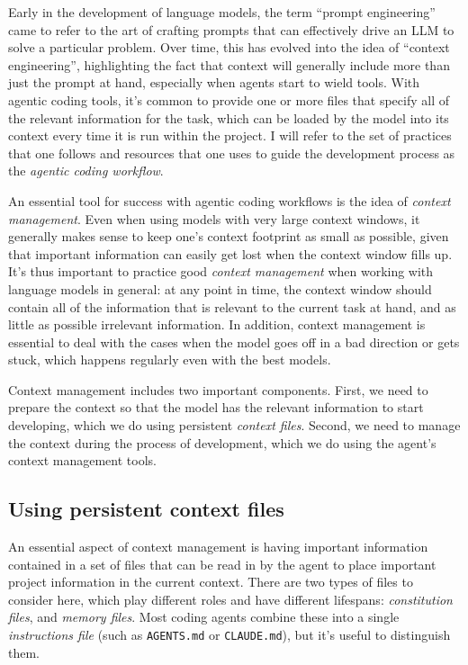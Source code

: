Early in the development of language models, the term ``prompt engineering'' came to refer to the art of crafting prompts that can effectively drive an LLM to solve a particular problem.
Over time, this has evolved into the idea of ``context engineering'', highlighting the fact that context will generally include more than just the prompt at hand, especially when agents start to wield tools.
With agentic coding tools, it's common to provide one or more files that specify all of the relevant information for the task, which can be loaded by the model into its context every time it is run within the project.
I will refer to the set of practices that one follows and resources that one uses to guide the development process as the \textit{agentic coding workflow}.

An essential tool for success with agentic coding workflows is the idea of \textit{context management}.
Even when using models with very large context windows, it generally makes sense to keep one's context footprint as small as possible, given that important information can easily get lost when the context window fills up.
It's thus important to practice good \textit{context management} when working with language models in general: at any point in time, the context window should contain all of the information that is relevant to the current task at hand, and as little as possible irrelevant information.
In addition, context management is essential to deal with the cases when the model goes off in a bad direction or gets stuck, which happens regularly even with the best models.

Context management includes two important components. First, we need to prepare the context so that the model has the relevant information to start developing, which we do using persistent \textit{context files}.  Second, we need to manage the context during the process of development, which we do using the agent's context management tools.

\subsection{Using persistent context files}

An essential aspect of context management is having important information contained in a set of files that can be read in by the agent to place important project information in the current context.  There are two types of files to consider here, which play different roles and have different lifespans: \textit{constitution files}, and \textit{memory files}.  Most coding agents combine these into a single \textit{instructions file} (such as \texttt{AGENTS.md} or \texttt{CLAUDE.md}), but it's useful to distinguish them.

